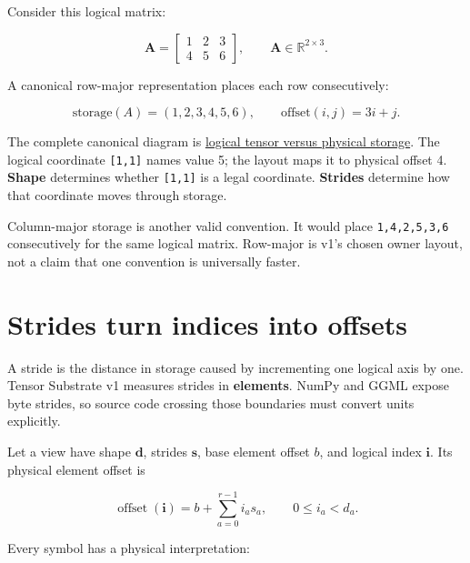 Consider this logical matrix:

\begin{equation}
\mathbf{A} =
\begin{bmatrix}
1 & 2 & 3 \\
4 & 5 & 6
\end{bmatrix},
\qquad \mathbf{A}\in\mathbb{R}^{2\times3}.
\end{equation}

A canonical row-major representation places each row consecutively:

\begin{equation}\mathrm{storage}(A)=(1,2,3,4,5,6),\qquad \mathrm{offset}(i,j)=3i+j.\end{equation}

The complete canonical diagram is
\href{https://github.com/hermonai/inside-the-llm-engine/blob/astra-visual-rewrite/diagrams/tensor/logical-vs-physical.txt}{logical
tensor versus physical storage}. The logical coordinate
\texttt{{[}1,1{]}} names value 5; the layout maps it to physical offset
4. \textbf{Shape} determines whether \texttt{{[}1,1{]}} is a legal
coordinate. \textbf{Strides} determine how that coordinate moves through
storage.

Column-major storage is another valid convention. It would place
\texttt{1,4,2,5,3,6} consecutively for the same logical matrix.
Row-major is v1's chosen owner layout, not a claim that one convention
is universally faster.

\section{Strides turn indices into
offsets}\label{strides-turn-indices-into-offsets}

A stride is the distance in storage caused by incrementing one logical
axis by one. Tensor Substrate v1 measures strides in \textbf{elements}.
NumPy and GGML expose byte strides, so source code crossing those
boundaries must convert units explicitly.

Let a view have shape \(\mathbf d\), strides \(\mathbf s\), base element
offset \(b\), and logical index \(\mathbf i\). Its physical element
offset is

\begin{equation}
\operatorname{offset}(\mathbf i)
= b + \sum_{a=0}^{r-1} i_a s_a,
\qquad 0 \le i_a < d_a.
\end{equation}

Every symbol has a physical interpretation:

